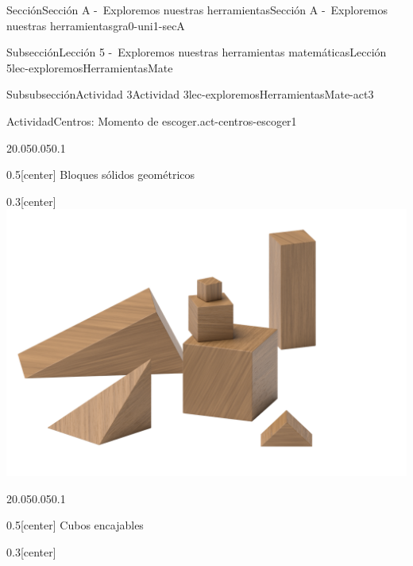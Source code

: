 \documentclass[twoside,10pt,]{article}
\begin{document}
\begin{sectionptx}{Sección}{Sección A -~Exploremos nuestras herramientas}{}{Sección A -~Exploremos nuestras herramientas}{}{}{gra0-uni1-secA}
\begin{subsectionptx}{Subsección}{Lección 5 -~Exploremos nuestras herramientas matemáticas}{}{Lección 5}{}{}{lec-exploremosHerramientasMate}
\begin{subsubsectionptx}{Subsubsección}{Actividad 3}{}{Actividad 3}{}{}{lec-exploremosHerramientasMate-act3}
\begin{activity}{Actividad}{Centros: Momento de escoger.}{act-centros-escoger1}
\begin{sidebyside}{2}{0.05}{0.05}{0.1}
\begin{sbspanel}{0.5}[center]%
Bloques sólidos geométricos%
\end{sbspanel}%
\begin{sbspanel}{0.3}[center]%
\includegraphics[width=\linewidth]{external/png-source/K.1.A Beta Student Workbook.Geoblocks.png}
\end{sbspanel}%
\end{sidebyside}%
\begin{sidebyside}{2}{0.05}{0.05}{0.1}%
\begin{sbspanel}{0.5}[center]%
Cubos encajables%
\end{sbspanel}%
\begin{sbspanel}{0.3}[center]%

\end{sbspanel}
\end{sidebyside}
\end{activity}
\end{subsubsectionptx}
\end{subsectionptx}
\end{sectionptx}
\end{document}
